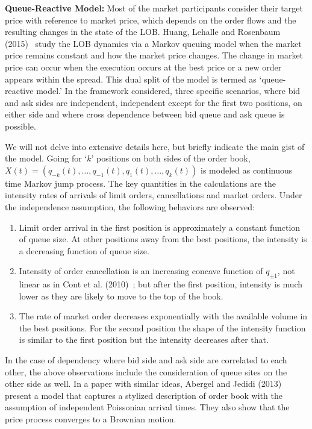 \noindent\textbf{Queue-Reactive Model:} Most of the market participants consider their target price with reference to market price, which depends on the order flows and the resulting changes in the state of the LOB. Huang, Lehalle and Rosenbaum (2015)~\cite{hlehros} study the LOB dynamics via a Markov queuing model when the market price remains constant and how the market price changes. The change in market price can occur when the execution occurs at the best price or a new order appears within the spread. This dual split of the model is termed as `queue-reactive model.' In the framework considered, three specific scenarios, where bid and ask sides are independent, independent except for the first two positions, on either side and where cross dependence between bid queue and ask queue is possible.


We will not delve into extensive details here, but briefly indicate the main gist of the model. Going for `$k$' positions on both sides of the order book, $X(t)= (q_{-k}(t),\ldots,q_{-1}(t),q_1(t),\ldots,q_k(t))$ is modeled as continuous time Markov jump process. The key quantities in the calculations are the intensity rates of arrivals of limit orders, cancellations and market orders. Under the independence assumption, the following behaviors are observed:

\begin{enumerate}[--]
\item Limit order arrival in the first position is approximately a constant function of queue size. At other positions away from the best positions, the intensity is a decreasing function of queue size. 

\item Intensity of order cancellation is an increasing concave function of $q_{\pm1}$, not linear as in Cont et al. (2010)~\cite{contstoi}; but after the first position, intensity is much lower as they are likely to move to the top of the book.

\item The rate of market order decreases exponentially with the available volume in the best positions. For the second position the shape of the intensity function is similar to the first position but the intensity decreases after that.
\end{enumerate}


In the case of dependency where bid side and ask side are correlated to each other, the above observations include the consideration of queue sites on the other side as well. In a paper with similar ideas, Abergel and Jedidi (2013)~\cite{aberjed} present a model that captures a stylized description of order book with the assumption of independent Poissonian arrival times. They also show that the price process converges to a Brownian motion. \twomedskip



